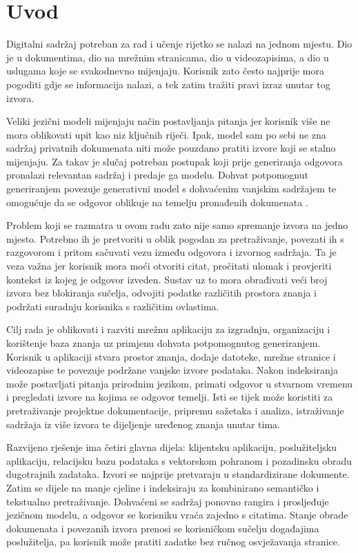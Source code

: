 \chapter{Uvod}

Digitalni sadržaj potreban za rad i učenje rijetko se nalazi na jednom mjestu. Dio je u dokumentima, dio na mrežnim stranicama, dio u videozapisima, a dio u uslugama koje se svakodnevno mijenjaju. Korisnik zato često najprije mora pogoditi gdje se informacija nalazi, a tek zatim tražiti pravi izraz unutar tog izvora.

Veliki jezični modeli mijenjaju način postavljanja pitanja jer korisnik više ne mora oblikovati upit kao niz ključnih riječi. Ipak, model sam po sebi ne zna sadržaj privatnih dokumenata niti može pouzdano pratiti izvore koji se stalno mijenjaju. Za takav je slučaj potreban postupak koji prije generiranja odgovora pronalazi relevantan sadržaj i predaje ga modelu. Dohvat potpomognut generiranjem povezuje generativni model s dohvaćenim vanjskim sadržajem te omogućuje da se odgovor oblikuje na temelju pronađenih dokumenata \cite{awsRagGuide}.

Problem koji se razmatra u ovom radu zato nije samo spremanje izvora na jedno mjesto. Potrebno ih je pretvoriti u oblik pogodan za pretraživanje, povezati ih s razgovorom i pritom sačuvati vezu između odgovora i izvornog sadržaja. Ta je veza važna jer korisnik mora moći otvoriti citat, pročitati ulomak i provjeriti kontekst iz kojeg je odgovor izveden. Sustav uz to mora obrađivati veći broj izvora bez blokiranja sučelja, odvojiti podatke različitih prostora znanja i podržati suradnju korisnika s različitim ovlastima.

Cilj rada je oblikovati i razviti mrežnu aplikaciju za izgradnju, organizaciju i korištenje baza znanja uz primjenu dohvata potpomognutog generiranjem. Korisnik u aplikaciji stvara prostor znanja, dodaje datoteke, mrežne stranice i videozapise te povezuje podržane vanjske izvore podataka. Nakon indeksiranja može postavljati pitanja prirodnim jezikom, primati odgovor u stvarnom vremenu i pregledati izvore na kojima se odgovor temelji. Isti se tijek može koristiti za pretraživanje projektne dokumentacije, pripremu sažetaka i analiza, istraživanje sadržaja iz više izvora te dijeljenje uređenog znanja unutar tima.

Razvijeno rješenje ima četiri glavna dijela: klijentsku aplikaciju, poslužiteljsku aplikaciju, relacijsku bazu podataka s vektorskom pohranom i pozadinsku obradu dugotrajnih zadataka. Izvori se najprije pretvaraju u standardizirane dokumente. Zatim se dijele na manje cjeline i indeksiraju za kombinirano semantičko i tekstualno pretraživanje. Dohvaćeni se sadržaj ponovno rangira i prosljeđuje jezičnom modelu, a odgovor se korisniku vraća zajedno s citatima. Stanje obrade dokumenata i povezanih izvora prenosi se korisničkom sučelju događajima poslužitelja, pa korisnik može pratiti zadatke bez ručnog osvježavanja stranice.

